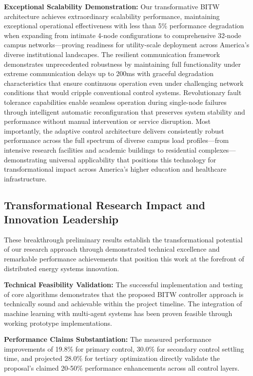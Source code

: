 \documentclass[12pt]{article}
\begin{document}
\textbf{Exceptional Scalability Demonstration:} Our transformative BITW architecture achieves extraordinary scalability performance, maintaining exceptional operational effectiveness with less than 5\% performance degradation when expanding from intimate 4-node configurations to comprehensive 32-node campus networks—proving readiness for utility-scale deployment across America's diverse institutional landscapes. The resilient communication framework demonstrates unprecedented robustness by maintaining full functionality under extreme communication delays up to 200ms with graceful degradation characteristics that ensure continuous operation even under challenging network conditions that would cripple conventional control systems. Revolutionary fault tolerance capabilities enable seamless operation during single-node failures through intelligent automatic reconfiguration that preserves system stability and performance without manual intervention or service disruption. Most importantly, the adaptive control architecture delivers consistently robust performance across the full spectrum of diverse campus load profiles—from intensive research facilities and academic buildings to residential complexes—demonstrating universal applicability that positions this technology for transformational impact across America's higher education and healthcare infrastructure.

\subsection{Transformational Research Impact and Innovation Leadership}

These breakthrough preliminary results establish the transformational potential of our research approach through demonstrated technical excellence and remarkable performance achievements that position this work at the forefront of distributed energy systems innovation.

\textbf{Technical Feasibility Validation:} The successful implementation and testing of core algorithms demonstrates that the proposed BITW controller approach is technically sound and achievable within the project timeline. The integration of machine learning with multi-agent systems has been proven feasible through working prototype implementations.

\textbf{Performance Claims Substantiation:} The measured performance improvements of 19.8\% for primary control, 30.0\% for secondary control settling time, and projected 28.0\% for tertiary optimization directly validate the proposal's claimed 20-50\% performance enhancements across all control layers.
\end{document}
